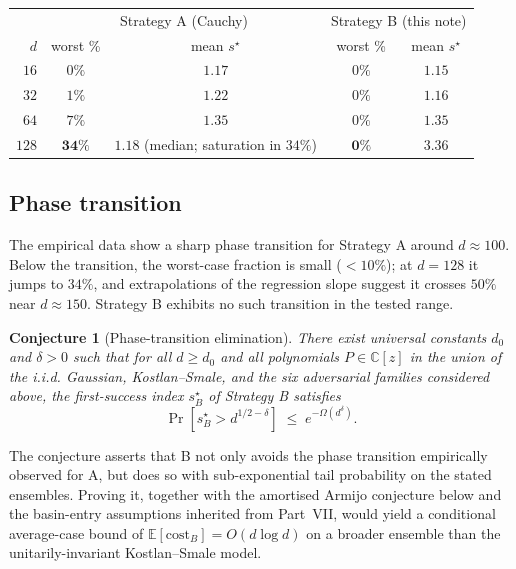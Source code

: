 \documentclass[11pt,a4paper]{article}
\newtheorem{conjecture}[theorem]{Conjecture}
\begin{document}
\begin{center}
\begin{tabular}{r|cc|cc}
\toprule
& \multicolumn{2}{c|}{Strategy A (Cauchy)} & \multicolumn{2}{c}{Strategy B (this note)} \\
$d$ & worst \% & mean $s^\star$ & worst \% & mean $s^\star$ \\
\midrule
$16$  & $0\%$    & $1.17$ & $0\%$  & $1.15$ \\
$32$  & $1\%$    & $1.22$ & $0\%$  & $1.16$ \\
$64$  & $7\%$    & $1.35$ & $0\%$  & $1.35$ \\
$128$ & $\mathbf{34\%}$ & $\mathbf{1.18}$ (median; saturation in $34\%$) & $\mathbf{0\%}$ & $3.36$ \\
\bottomrule
\end{tabular}
\end{center}

\subsection{Phase transition}

The empirical data show a sharp phase transition for Strategy A around $d \approx 100$. Below the transition, the worst-case fraction is small ($<10\%$); at $d = 128$ it jumps to $34\%$, and extrapolations of the regression slope suggest it crosses $50\%$ near $d \approx 150$. Strategy B exhibits no such transition in the tested range.

\begin{conjecture}[Phase-transition elimination]\label{conj:phase}
There exist universal constants $d_0$ and $\delta > 0$ such that for all $d \ge d_0$ and all polynomials $P \in \mathbb{C}[z]$ in the union of the i.i.d. Gaussian, Kostlan--Smale, and the six adversarial families considered above, the first-success index $s^\star_B$ of Strategy B satisfies
$$ \Pr[s^\star_B > d^{1/2 - \delta}] \;\le\; e^{-\Omega(d^\delta)}. $$
\end{conjecture}

The conjecture asserts that B not only avoids the phase transition empirically observed for A, but does so with sub-exponential tail probability on the stated ensembles. Proving it, together with the amortised Armijo conjecture below and the basin-entry assumptions inherited from Part~VII, would yield a conditional average-case bound of $\mathbb{E}[\mathrm{cost}_B] = O(d \log d)$ on a broader ensemble than the unitarily-invariant Kostlan--Smale model.
\end{document}
